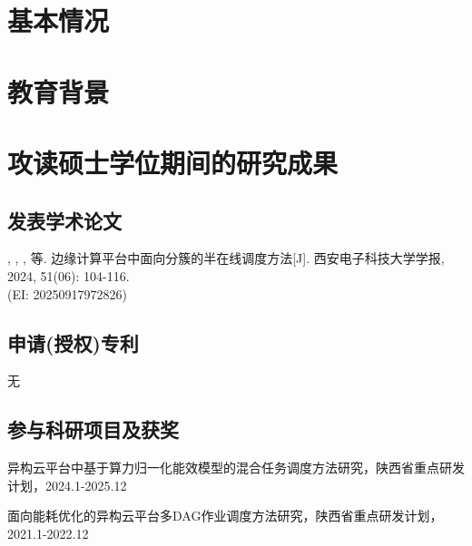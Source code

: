 \section{基本情况}
\section{教育背景}
\begin{edubg}
\end{edubg}
\section{攻读硕士学位期间的研究成果}
\subsection{发表学术论文}
\begin{resresult}
\item {}, , , 等. 边缘计算平台中面向分簇的半在线调度方法[J]. 西安电子科技大学学报, 2024, 51(06): 104-116. \\ (EI: 20250917972826)
\end{resresult}
\subsection{申请(授权)专利}
无
\subsection{参与科研项目及获奖}
\begin{resresult}
\item 异构云平台中基于算力归一化能效模型的混合任务调度方法研究，陕西省重点研发计划，2024.1-2025.12
\item 面向能耗优化的异构云平台多DAG作业调度方法研究，陕西省重点研发计划，2021.1-2022.12 
\end{resresult}
